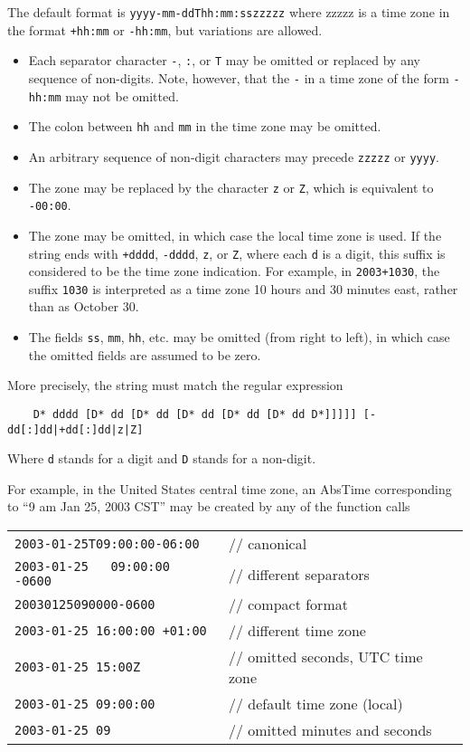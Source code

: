 \documentclass{article}
\begin{document}
\begin{description}
The default format is \verb/yyyy-mm-ddThh:mm:sszzzzz/ where zzzzz is a time
zone in the format \verb/+hh:mm/ or \verb/-hh:mm/, but variations are allowed.
\begin{itemize}
\item Each separator character \verb/-/, \verb/:/, or \verb/T/  may be omitted
or replaced by any sequence of non-digits.  Note, however, that the
\verb/-/ in a time zone of the form \verb/-hh:mm/ may not be omitted.
\item The colon between \verb/hh/ and \verb/mm/ in the time zone may be omitted.
\item An arbitrary sequence of non-digit characters may precede \verb/zzzzz/
or \verb/yyyy/.
\item The zone may be replaced by the character \verb/z/ or \verb/Z/, which is
equivalent to \verb/-00:00/.
\item The zone may be omitted, in which case the local time zone is used.
If the string ends with \verb/+dddd/, \verb/-dddd/, \verb/z/, or
\verb/Z/, where each \verb/d/ is a digit, this suffix is considered to be
the time zone indication.  For example, in \verb/2003+1030/, the suffix
\verb/1030/ is interpreted as a time zone 10 hours and 30 minutes east,
rather than as October 30.
\item The fields \verb/ss/, \verb/mm/, \verb/hh/, etc. may be omitted (from
right to left), in which case the omitted fields are assumed to be zero.
\end{itemize}
More precisely, the string must match the regular expression
\begin{verbatim}
    D* dddd [D* dd [D* dd [D* dd [D* dd [D* dd D*]]]]] [-dd[:]dd|+dd[:]dd|z|Z]
\end{verbatim}
Where \verb/d/ stands for a digit and \verb/D/ stands for a non-digit.

For example, in the United States central time zone, an AbsTime
corresponding to ``9 am Jan 25, 2003 CST'' may be created by any of the
function calls

\begin{tabular}{ll}
\verb/2003-01-25T09:00:00-06:00/ & // canonical \\
\verb/2003-01-25   09:00:00 -0600/ & // different separators \\
\verb/20030125090000-0600/       & // compact format \\
\verb/2003-01-25 16:00:00 +01:00/ & // different time zone \\
\verb/2003-01-25 15:00Z/         & // omitted seconds, UTC time zone \\
\verb/2003-01-25 09:00:00/       & // default time zone (local) \\
\verb/2003-01-25 09/             & // omitted minutes and seconds 
\end{tabular}


\end{description}
\end{document}
